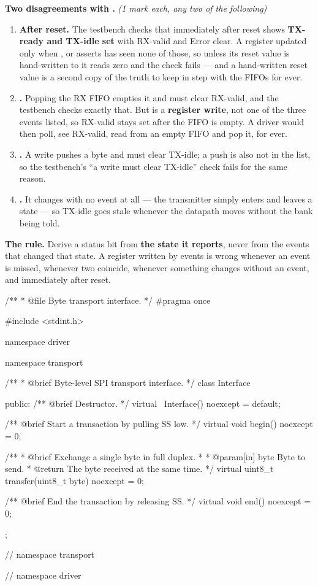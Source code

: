 \textbf{Two disagreements with .} \textit{(1 mark each, any two of the
following)}
\begin{enumerate}
  \item \textbf{After reset.} The testbench checks that  immediately after reset shows
    \textbf{TX-ready and TX-idle set} with RX-valid and Error clear. A register updated only when
    ,  or  asserts has seen none of those, so unless its
    reset value is hand-written to  it reads zero and the check fails --- and a
    hand-written reset value is a second copy of the truth to keep in step with the FIFOs for ever.
  \item \textbf{.} Popping the RX FIFO empties it and must clear RX-valid, and the
    testbench checks exactly that. But  is a \textbf{register write}, not one of the
    three events listed, so RX-valid stays set after the FIFO is empty. A driver would then poll, see
    RX-valid, read  from an empty FIFO and pop it, for ever.
  \item \textbf{.} A write pushes a byte and must clear TX-idle; a push is also not in
    the list, so the testbench's ``a  write must clear TX-idle'' check fails for the
    same reason.
  \item \textbf{.} It changes with no event at all --- the transmitter simply enters
    and leaves a state --- so TX-idle goes stale whenever the datapath moves without the bank being
    told.
\end{enumerate}

\textbf{The rule.} Derive a status bit from \textbf{the state it reports}, never from the events that
changed that state. A register written by events is wrong whenever an event is missed, whenever two
coincide, whenever something changes without an event, and immediately after reset.


\begin{cppcode}
/**
 * @file Byte transport interface.
 */
#pragma once

#include <stdint.h>

namespace driver
{
namespace transport
{
/**
 * @brief Byte-level SPI transport interface.
 */
class Interface
{
public:
    /** @brief Destructor. */
    virtual ~Interface() noexcept = default;

    /** @brief Start a transaction by pulling SS low. */
    virtual void begin() noexcept = 0;

    /**
     * @brief Exchange a single byte in full duplex.
     *
     * @param[in] byte Byte to send.
     * @return The byte received at the same time.
     */
    virtual uint8_t transfer(uint8_t byte) noexcept = 0;

    /** @brief End the transaction by releasing SS. */
    virtual void end() noexcept = 0;
};
} // namespace transport
} // namespace driver
\end{cppcode}

